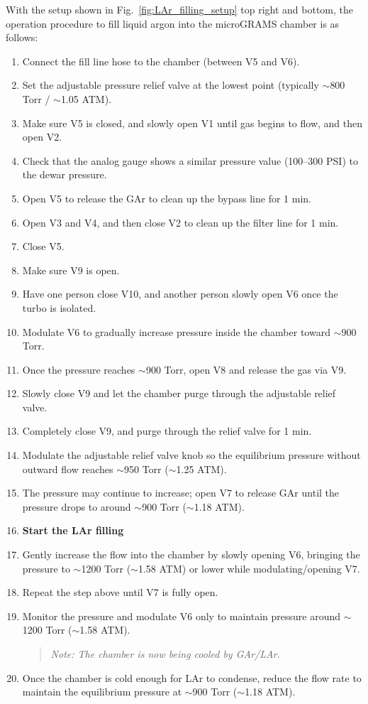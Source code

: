With the setup shown in Fig.~\ref{fig:LAr_filling_setup} top right and bottom, the operation procedure to fill liquid argon into the microGRAMS chamber is as follows:
\begin{enumerate}[label=\arabic*.]
    \item Connect the fill line hose to the chamber (between V5 and V6).
    \item Set the adjustable pressure relief valve at the lowest point (typically $\sim$800 Torr / $\sim$1.05 ATM).
    \item Make sure V5 is closed, and slowly open V1 until gas begins to flow, and then open V2.
    \item Check that the analog gauge shows a similar pressure value (100--300 PSI) to the dewar pressure.
    \item Open V5 to release the GAr to clean up the bypass line for 1 min.
    \item Open V3 and V4, and then close V2 to clean up the filter line for 1 min.
    \item Close V5.
    \item Make sure V9 is open.
    \item Have one person close V10, and another person slowly open V6 once the turbo is isolated.
    \item Modulate V6 to gradually increase pressure inside the chamber toward $\sim$900 Torr.
    \item Once the pressure reaches $\sim$900 Torr, open V8 and release the gas via V9.
    \item Slowly close V9 and let the chamber purge through the adjustable relief valve.
    \item Completely close V9, and purge through the relief valve for 1 min.
    \item Modulate the adjustable relief valve knob so the equilibrium pressure without outward flow reaches $\sim$950 Torr ($\sim$1.25 ATM).
    \item The pressure may continue to increase; open V7 to release GAr until the pressure drops to around $\sim$900 Torr ($\sim$1.18 ATM).
    
    \item \textbf{Start the LAr filling}
    
    \item Gently increase the flow into the chamber by slowly opening V6, bringing the pressure to $\sim$1200 Torr ($\sim$1.58 ATM) or lower while modulating/opening V7.
    \item Repeat the step above until V7 is fully open.
    \item Monitor the pressure and modulate V6 only to maintain pressure around $\sim$1200 Torr ($\sim$1.58 ATM). 
    \begin{quote}
        \textit{Note: The chamber is now being cooled by GAr/LAr.}
    \end{quote}
    \item Once the chamber is cold enough for LAr to condense, reduce the flow rate to maintain the equilibrium pressure at $\sim$900 Torr ($\sim$1.18 ATM).
    

\end{enumerate}
